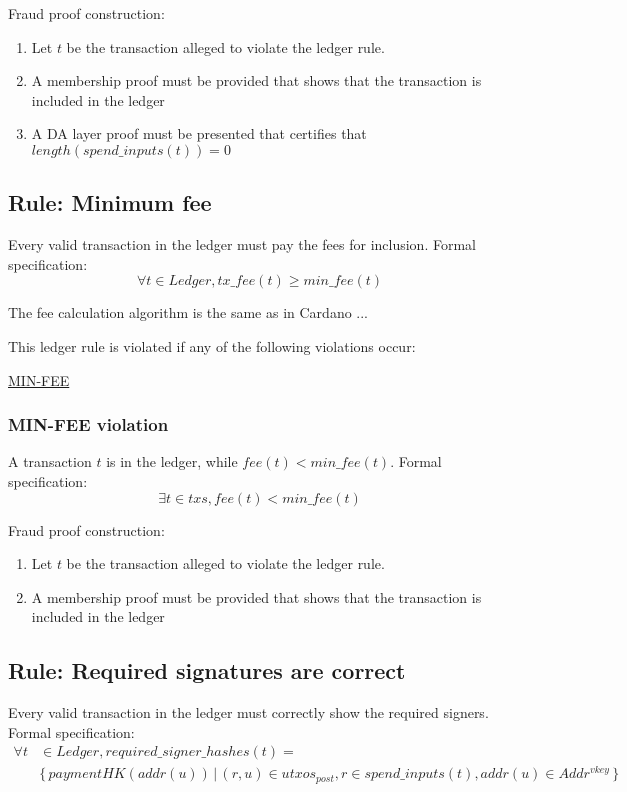 \documentclass[../midgard.tex]{subfiles}
\begin{document}
Fraud proof construction:
\begin{enumerate}
  \item Let $t$ be the transaction alleged to violate the ledger rule. 
  \item A membership proof must be provided that shows that the transaction is included in the ledger
  \item A DA layer proof must be presented that certifies that $length(spend\_inputs(t)) = 0$ \todo
\end{enumerate}

\subsection{Rule: Minimum fee}
\label{rule:minimum-fee}
Every valid transaction in the ledger must pay the fees for inclusion.
Formal specification:
\begin{equation*}
    \forall t \in Ledger, tx\_fee(t) \geq min\_fee(t)
\end{equation*}

The fee calculation algorithm is the same as in Cardano ... \todo

This ledger rule is violated if any of the following violations occur:
\begin{itemize-multi}
  \item \hyperref[violation:MIN-FEE]{MIN-FEE}
\end{itemize-multi} 

\subsubsection{MIN-FEE violation}
\label{violation:MIN-FEE}
A transaction $t$ is in the ledger, while $fee(t) < min\_fee(t)$.
Formal specification:
\begin{equation*}
    \exists t \in txs, fee(t) < min\_fee(t)
\end{equation*}

Fraud proof construction:
\begin{enumerate}
  \item Let $t$ be the transaction alleged to violate the ledger rule. 
  \item A membership proof must be provided that shows that the transaction is included in the ledger
\end{enumerate}

\subsection{Rule: Required signatures are correct}
\label{rule:required-signatures-are-correct}
Every valid transaction in the ledger must correctly show the required signers.
Formal specification:
\begin{equation*}
\begin{split}
    \forall t & \in Ledger, required\_signer\_hashes(t) = \\
    & \{ \, paymentHK(addr(u)) \, | \, (r, u) \in utxos_{post}, r \in spend\_inputs(t), addr(u) \in Addr^{vkey} \, \}
\end{split}
\end{equation*}
    
\end{document}
